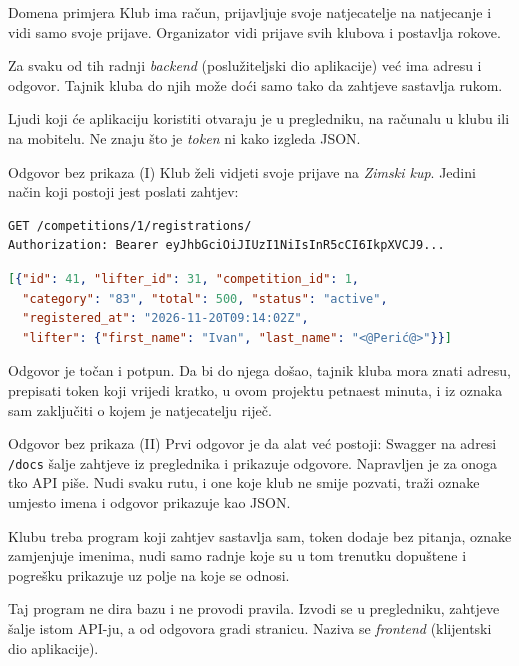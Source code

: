 \begin{frame}{Domena primjera}
Klub ima račun, prijavljuje svoje natjecatelje na natjecanje i vidi samo svoje prijave. Organizator vidi prijave svih klubova i postavlja rokove.

\vspace{0.9em}
Za svaku od tih radnji \emph{backend} (poslužiteljski dio aplikacije) već ima adresu i odgovor. Tajnik kluba do njih može doći samo tako da zahtjeve sastavlja rukom.

\vspace{0.9em}
Ljudi koji će aplikaciju koristiti otvaraju je u pregledniku, na računalu u klubu ili na mobitelu. Ne znaju što je \emph{token} ni kako izgleda JSON.
\end{frame}

\begin{frame}[fragile]{Odgovor bez prikaza (I)}
Klub želi vidjeti svoje prijave na \emph{Zimski kup}. Jedini način koji postoji jest poslati zahtjev:

\begin{lstlisting}
GET /competitions/1/registrations/
Authorization: Bearer eyJhbGciOiJIUzI1NiIsInR5cCI6IkpXVCJ9...
\end{lstlisting}

\vspace{0.2em}
\begin{lstlisting}[language=json]
[{"id": 41, "lifter_id": 31, "competition_id": 1,
  "category": "83", "total": 500, "status": "active",
  "registered_at": "2026-11-20T09:14:02Z",
  "lifter": {"first_name": "Ivan", "last_name": "<@Perić@>"}}]
\end{lstlisting}

\vspace{0.3em}
Odgovor je točan i potpun. Da bi do njega došao, tajnik kluba mora znati adresu, prepisati token koji vrijedi kratko, u ovom projektu petnaest minuta, i iz oznaka sam zaključiti o kojem je natjecatelju riječ.
\end{frame}

\begin{frame}{Odgovor bez prikaza (II)}
Prvi odgovor je da alat već postoji: Swagger na adresi \texttt{/docs} šalje zahtjeve iz preglednika i prikazuje odgovore. Napravljen je za onoga tko API piše. Nudi svaku rutu, i one koje klub ne smije pozvati, traži oznake umjesto imena i odgovor prikazuje kao JSON.

\vspace{0.9em}
Klubu treba program koji zahtjev sastavlja sam, token dodaje bez pitanja, oznake zamjenjuje imenima, nudi samo radnje koje su u tom trenutku dopuštene i pogrešku prikazuje uz polje na koje se odnosi.

\vspace{0.9em}
Taj program ne dira bazu i ne provodi pravila. Izvodi se u pregledniku, zahtjeve šalje istom API-ju, a od odgovora gradi stranicu. Naziva se \emph{frontend} (klijentski dio aplikacije).
\end{frame}

